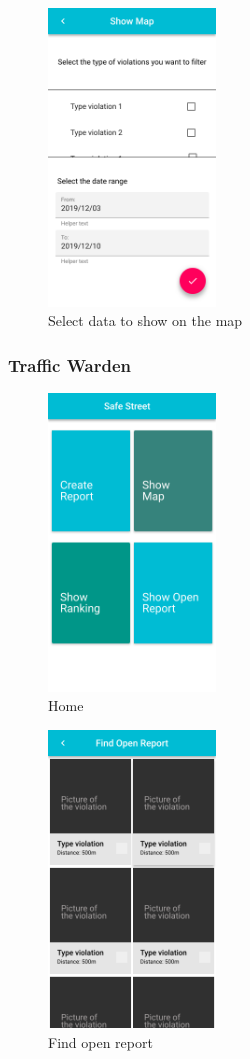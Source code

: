 \documentclass{article}
\begin{document}
\begin{figure}[!htb]
		\centering
		\includegraphics[height=7.9cm,keepaspectratio]{images/mockups/Show_Map_Filter.png}
		\caption{Select data to show on the map}
\end{figure}

\clearpage
\subsubsection{Traffic Warden}
\begin{figure}[!htb]
		\centering
		\includegraphics[height=7.9cm,keepaspectratio]{images/mockups/Home_Traffic_Warden.png}
		\caption{Home}
\end{figure}

\begin{figure}[!htb]
		\centering
		\includegraphics[height=7.9cm,keepaspectratio]{images/mockups/Open_Report_Map.png}
		\caption{Find open report}
\end{figure}
\end{document}
